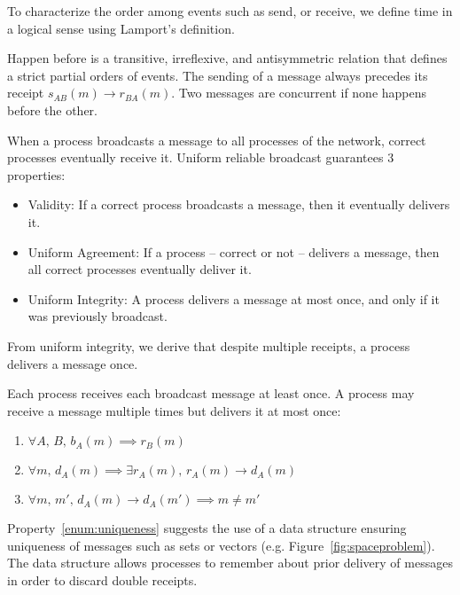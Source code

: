 To characterize the order among events such as send, or receive, we define time
in a logical sense using Lamport’s definition.

\begin{definition}
  Happen before is a transitive, irreflexive, and antisymmetric relation that
  defines a strict partial orders of events. The sending of a message always
  precedes its receipt $s_{AB}(m) \rightarrow r_{BA}(m)$. Two messages are
  concurrent if none happens before the other.
\end{definition}

\begin{definition} 
  When a process broadcasts a message to all processes of the network, correct
  processes eventually receive it. Uniform reliable broadcast guarantees 3
  properties:
  \begin{itemize}[leftmargin=*]
  \item Validity: If a correct process broadcasts a message, then it
    eventually delivers it.
  \item Uniform Agreement: If a process -- correct or not -- delivers a message,
    then all correct processes eventually deliver it.
  \item Uniform Integrity: A process delivers a message at most once, and only if
    it was previously broadcast.
  \end{itemize}
\end{definition}

From uniform integrity, we derive that despite multiple receipts, a process
delivers a message once.

\begin{definition}
  Each process receives each broadcast message at least once. A process may receive
  a message multiple times but delivers it at most once:
  \begin{enumerate}
  \item $\forall A,\,B,\, b_A(m) \implies r_B(m)$
  \item $\forall m,\, d_A(m) \implies \exists r_A(m),\, r_A(m) \rightarrow d_A(m)$
  \item \label{enum:uniqueness}
    $\forall m,\,m',\, d_A(m) \rightarrow d_A(m') \implies m \neq m'$
  \end{enumerate}
\end{definition}

Property~\ref{enum:uniqueness} suggests the use of a data structure ensuring
uniqueness of messages such as sets or vectors
(e.g. Figure~\ref{fig:spaceproblem}). The data structure allows processes to
remember about prior delivery of messages in order to discard double receipts.

